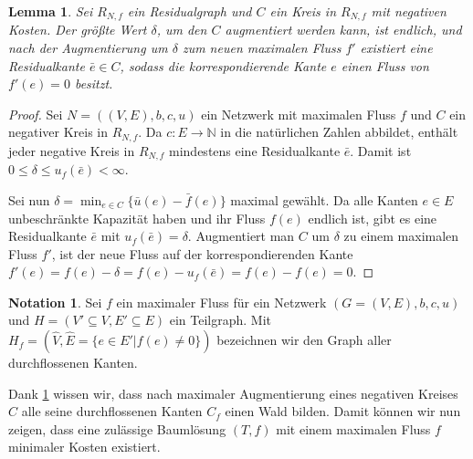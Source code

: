 \documentclass[a4paper,twoside,ngerman]{report}
\theoremstyle{plain}
\newtheorem{lem}[thm]{Lemma}
\theoremstyle{definition}
\newtheorem*{nota}{Notation}
\begin{document}
\begin{lem}\label{negKreis}Sei $R_{N,f}$ ein Residualgraph und $C$ ein Kreis in $R_{N,f}$ mit negativen Kosten. Der größte Wert $\delta$, um den $C$ augmentiert werden kann, ist endlich, und nach der Augmentierung um $\delta$ zum neuen maximalen Fluss $f'$ existiert eine Residualkante $\bar{e}\in C$, sodass die korrespondierende Kante $e$ einen Fluss von $f'(e)=0$ besitzt. 
\end{lem}
\begin{proof}Sei $N=((V,E),b,c,u)$ ein Netzwerk mit maximalen Fluss $f$ und $C$ ein negativer Kreis in $R_{N,f}$. Da $c:E\rightarrow\mathbb{N}$ in die natürlichen Zahlen abbildet, enthält jeder negative Kreis in $R_{N,f}$ mindestens eine Residualkante $\bar{e}$. Damit ist $0\leq\delta\leq u_f(\bar{e})<\infty$.
	
Sei nun $\delta=\min_{e\in C}\{\bar{u}(e)-\bar{f}(e)\}$ maximal gewählt. Da alle Kanten $e\in E$ unbeschränkte Kapazität haben und ihr Fluss $f(e)$ endlich ist, gibt es eine Residualkante $\bar{e}$ mit $u_f(\bar{e})=\delta$. Augmentiert man $C$ um $\delta$ zu einem maximalen Fluss $f'$, ist der neue Fluss auf der korrespondierenden Kante $f'(e)=f(e)-\delta=f(e)-u_f(\bar{e})=f(e)-f(e)=0$.\end{proof}

\begin{nota}Sei $f$ ein maximaler Fluss für ein Netzwerk $(G=(V,E),b,c,u)$ und $H=(V'\subseteq V, E'\subseteq E)$ ein Teilgraph. Mit $H_f=(\hat{V},\hat{E}=\{e\in E' | f(e) \neq 0\})$ bezeichnen wir den Graph aller durchflossenen Kanten.\end{nota}

Dank \cref{negKreis} wissen wir, dass nach maximaler Augmentierung eines negativen Kreises $C$ alle seine durchflossenen Kanten $C_f$ einen Wald bilden. Damit können wir nun zeigen, dass eine zulässige Baumlösung $(T,f)$ mit einem maximalen Fluss $f$ minimaler Kosten existiert.
\end{document}
